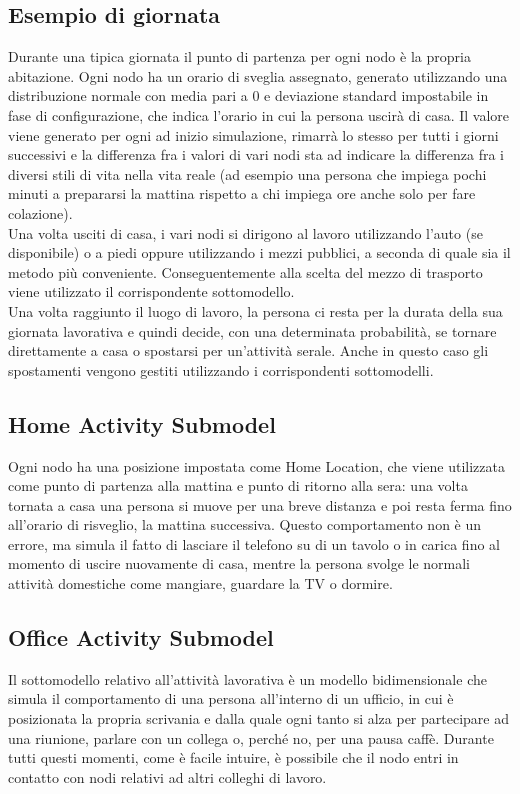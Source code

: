 \subsection{Esempio di giornata}
Durante una tipica giornata il punto di partenza per ogni nodo è la propria abitazione. Ogni nodo ha un orario di sveglia assegnato, generato utilizzando una distribuzione normale con media pari a 0 e deviazione standard impostabile in fase di configurazione, che indica l'orario in cui la persona uscirà di casa. Il valore viene generato per ogni ad inizio simulazione, rimarrà lo stesso per tutti i giorni successivi e la differenza fra i valori di vari nodi sta ad indicare la differenza fra i diversi stili di vita nella vita reale (ad esempio una persona che impiega pochi minuti a prepararsi la mattina rispetto a chi impiega ore anche solo per fare colazione).
\\ 

Una volta usciti di casa, i vari nodi si dirigono al lavoro utilizzando l'auto (se disponibile) o a piedi oppure utilizzando i mezzi pubblici, a seconda di quale sia il metodo più conveniente. Conseguentemente alla scelta del mezzo di trasporto viene utilizzato il corrispondente sottomodello.
\\

Una volta raggiunto il luogo di lavoro, la persona ci resta per la durata della sua giornata lavorativa e quindi decide, con una determinata probabilità, se tornare direttamente a casa o spostarsi per un'attività serale. Anche in questo caso gli spostamenti vengono gestiti utilizzando i corrispondenti sottomodelli.


\subsection{Home Activity Submodel}
Ogni nodo ha una posizione impostata come Home Location, che viene utilizzata come punto di partenza alla mattina e punto di ritorno alla sera: una volta tornata a casa una persona si muove per una breve distanza e poi resta ferma fino all'orario di risveglio, la mattina successiva. Questo comportamento non è un errore, ma simula il fatto di lasciare il telefono su di un tavolo o in carica fino al momento di uscire nuovamente di casa, mentre la persona svolge le normali attività domestiche come mangiare, guardare la TV o dormire.

\subsection{Office Activity Submodel}
Il sottomodello relativo all'attività lavorativa è un modello bidimensionale che simula il comportamento di una persona all'interno di un ufficio, in cui è posizionata la propria scrivania e dalla quale ogni tanto si alza per partecipare ad una riunione, parlare con un collega o, perché no, per una pausa caffè. Durante tutti questi momenti, come è facile intuire, è possibile che il nodo entri in contatto con nodi relativi ad altri colleghi di lavoro.
\\

